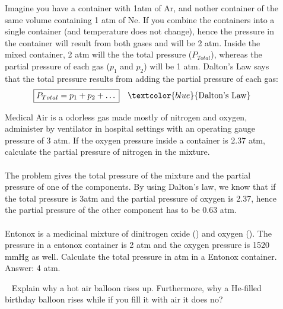 \documentclass[main.tex]{subfiles}
\begin{document}
\sloppy 
\begin{description}
\item[] 
Imagine you have a container with 1atm of Ar, and nother container of the same volume containing 1 atm of Ne. If you combine the containers into a single container (and temperature does not change), hence the pressure in the container will result from both gases and will be 2 atm. Inside the mixed container, 2 atm will the the total pressure ($P_{Total}$), whereas the partial pressure of each gas ($p_{1}$ and $p_{2}$) will be 1 atm. Dalton's Law says that the total pressure results from adding the partial pressure of each gas:
\begin{equation*}
\boxed{  P_{Total}=p_1+p_2+\dots } \quad \textcolor{blue}{\text{Dalton's Law}}
\end{equation*}
\begin{example} %
Medical Air is a odorless gas made mostly of nitrogen and oxygen,  administer by ventilator in hospital settings with an operating gauge pressure of 3 atm. If the oxygen pressure inside a container is 2.37 atm, calculate the partial pressure of nitrogen in the mixture. 
\\
\\
The problem gives the total pressure of the mixture and the partial pressure of one of the components. By using Dalton's law, we know that if the total pressure is 3atm and the partial pressure of oxygen is 2.37, hence the partial pressure of the other component has to be 0.63 atm.
\\
\faDiamond\ \\
Entonox is a medicinal mixture of dinitrogen oxide () and oxygen (). The pressure  in a entonox container is 2 atm and the oxygen pressure is 1520 mmHg as well. Calculate the total pressure in atm in a Entonox container.
\\
\flushright Answer: 4 atm.
\end{example}%




\begin{marginfigure}
\begin{tcolorbox}[enhanced,colback=red!5!white,colframe=black!50!red,boxrule=1pt,
  arc=0pt,outer arc=0pt,drop heavy lifted shadow]
\faGears\ 
 Explain why a hot air balloon rises up. Furthermore, why a He-filled birthday balloon rises while if you fill it with air it does no?
\end{tcolorbox}
\end{marginfigure} 


\end{description}
\end{document}
